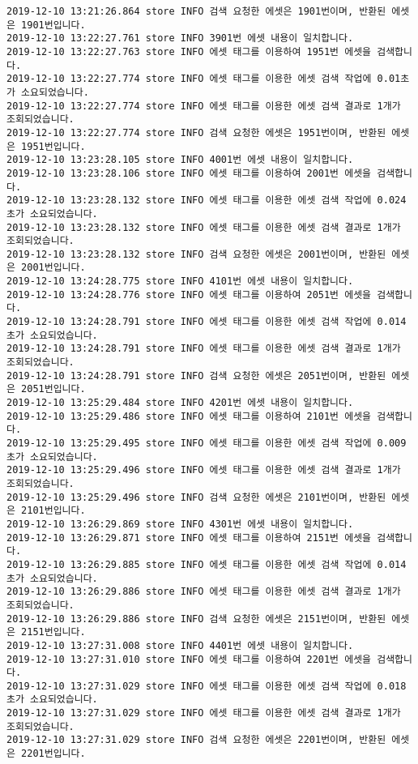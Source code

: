 \begin{Verbatim}[fontsize=\tiny, breaklines=true, breakanywhere=true]
2019-12-10 13:21:26.864 store INFO 검색 요청한 에셋은 1901번이며, 반환된 에셋은 1901번입니다.
2019-12-10 13:22:27.761 store INFO 3901번 에셋 내용이 일치합니다.
2019-12-10 13:22:27.763 store INFO 에셋 태그를 이용하여 1951번 에셋을 검색합니다.
2019-12-10 13:22:27.774 store INFO 에셋 태그를 이용한 에셋 검색 작업에 0.01초가 소요되었습니다.
2019-12-10 13:22:27.774 store INFO 에셋 태그를 이용한 에셋 검색 결과로 1개가 조회되었습니다.
2019-12-10 13:22:27.774 store INFO 검색 요청한 에셋은 1951번이며, 반환된 에셋은 1951번입니다.
2019-12-10 13:23:28.105 store INFO 4001번 에셋 내용이 일치합니다.
2019-12-10 13:23:28.106 store INFO 에셋 태그를 이용하여 2001번 에셋을 검색합니다.
2019-12-10 13:23:28.132 store INFO 에셋 태그를 이용한 에셋 검색 작업에 0.024초가 소요되었습니다.
2019-12-10 13:23:28.132 store INFO 에셋 태그를 이용한 에셋 검색 결과로 1개가 조회되었습니다.
2019-12-10 13:23:28.132 store INFO 검색 요청한 에셋은 2001번이며, 반환된 에셋은 2001번입니다.
2019-12-10 13:24:28.775 store INFO 4101번 에셋 내용이 일치합니다.
2019-12-10 13:24:28.776 store INFO 에셋 태그를 이용하여 2051번 에셋을 검색합니다.
2019-12-10 13:24:28.791 store INFO 에셋 태그를 이용한 에셋 검색 작업에 0.014초가 소요되었습니다.
2019-12-10 13:24:28.791 store INFO 에셋 태그를 이용한 에셋 검색 결과로 1개가 조회되었습니다.
2019-12-10 13:24:28.791 store INFO 검색 요청한 에셋은 2051번이며, 반환된 에셋은 2051번입니다.
2019-12-10 13:25:29.484 store INFO 4201번 에셋 내용이 일치합니다.
2019-12-10 13:25:29.486 store INFO 에셋 태그를 이용하여 2101번 에셋을 검색합니다.
2019-12-10 13:25:29.495 store INFO 에셋 태그를 이용한 에셋 검색 작업에 0.009초가 소요되었습니다.
2019-12-10 13:25:29.496 store INFO 에셋 태그를 이용한 에셋 검색 결과로 1개가 조회되었습니다.
2019-12-10 13:25:29.496 store INFO 검색 요청한 에셋은 2101번이며, 반환된 에셋은 2101번입니다.
2019-12-10 13:26:29.869 store INFO 4301번 에셋 내용이 일치합니다.
2019-12-10 13:26:29.871 store INFO 에셋 태그를 이용하여 2151번 에셋을 검색합니다.
2019-12-10 13:26:29.885 store INFO 에셋 태그를 이용한 에셋 검색 작업에 0.014초가 소요되었습니다.
2019-12-10 13:26:29.886 store INFO 에셋 태그를 이용한 에셋 검색 결과로 1개가 조회되었습니다.
2019-12-10 13:26:29.886 store INFO 검색 요청한 에셋은 2151번이며, 반환된 에셋은 2151번입니다.
2019-12-10 13:27:31.008 store INFO 4401번 에셋 내용이 일치합니다.
2019-12-10 13:27:31.010 store INFO 에셋 태그를 이용하여 2201번 에셋을 검색합니다.
2019-12-10 13:27:31.029 store INFO 에셋 태그를 이용한 에셋 검색 작업에 0.018초가 소요되었습니다.
2019-12-10 13:27:31.029 store INFO 에셋 태그를 이용한 에셋 검색 결과로 1개가 조회되었습니다.
2019-12-10 13:27:31.029 store INFO 검색 요청한 에셋은 2201번이며, 반환된 에셋은 2201번입니다.

\end{Verbatim}

